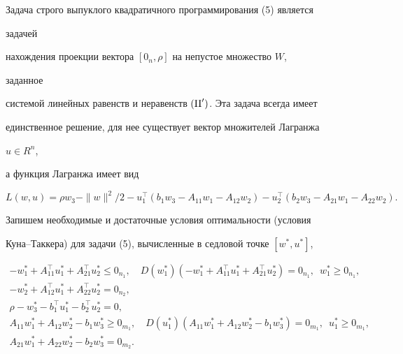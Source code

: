 \begin{pf}


Задача строго выпуклого квадратичного программирования (5) является 


задачей


нахождения проекции вектора $[0_n,\rho]$ на непустое множество $W$, 


заданное


системой линейных равенств и неравенств $(\mathrm{II} ')$. Эта задача всегда имеет


единственное решение, для нее существует вектор множителей Лагранжа 


$u\in R^n$,


а функция Лагранжа имеет вид


$$


L(w,u)=\rho w_3-\|w\|^2/2-u^\top_1(b_1w_3-A_{11}w_1-A_{12}w_2)-


u^\top_2(b_2w_3-A_{21}w_1-A_{22}w_2).


$$


Запишем необходимые и достаточные условия оптимальности (условия


Куна--Таккера) для задачи (5), вычисленные в седловой точке $[w^*,u^*]$,


\begin{gather}


-w^*_1+A^\top_{11}u^*_1+A^\top_{21}u^*_2\le0_{n_1},\quad


D(w^*_1)(-w^*_1+A^\top_{11}u^*_1+A^\top_{21}u^*_2)=0_{n_1},


\ \; w^*_1\ge0_{n_1},\\


%


-w^*_2+A^\top_{12}u^*_1+A^\top_{22}u^*_2=0_{n_2},\\


%


\rho-w^*_3-b^\top_1 u^*_1-b^\top_2u^*_2=0,\\


%


A_{11}w^*_1+A_{12}w^*_2-b_1w^*_3\ge0_{m_1},\quad


D(u^*_1)(A_{11}w^*_1+A_{12}w^*_2-b_1w^*_3)=0_{m_1},


\ \; u^*_1\ge0_{m_1},\\


%


A_{21}w^*_1+A_{22}w^*_2-b_2w^*_3=0_{m_2}.


\end{gather}






\end{pf}
